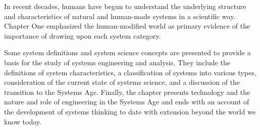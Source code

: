 In recent decades, humans have begun to understand the underlying structure and characteristics of natural and human-made systems in a scientific way. Chapter One emphasized the human-modified world as primary evidence of the importance of drawing upon each system category.

Some system definitions and system science concepts are presented to provide a basis for the study of systems engineering and analysis. They include the definitions of system characteristics, a classification of systems into various types, consideration of the current state of systems science, and a discussion of the transition to the Systems Age. Finally, the chapter presents technology and the nature and role of engineering in the Systems Age and ends with an account of the development of systems thinking to date with extension beyond the world we know today.